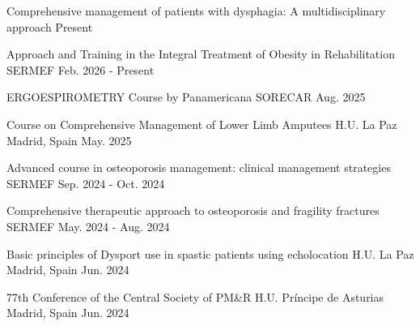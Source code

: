 

\begin{cventries}

  \cventry
    {Comprehensive management of patients with dysphagia: A multidisciplinary approach} %
    {} %
    {} %
    {Present} %
    {}

  \cventry
    {Approach and Training in the Integral Treatment of Obesity in Rehabilitation} %
    {SERMEF} %
    {} %
    {Feb. 2026 - Present} %
    {}

  \cventry
    {ERGOESPIROMETRY Course by Panamericana} %
    {SORECAR} %
    {} %
    {Aug. 2025} %
    {}

  \cventry
    {Course on Comprehensive Management of Lower Limb Amputees} %
    {H.U. La Paz} %
    {Madrid, Spain} %
    {May. 2025} %
    {}

  \cventry
    {Advanced course in osteoporosis management: clinical management strategies} %
    {SERMEF} %
    {} %
    {Sep. 2024 - Oct. 2024} %
    {}

  \cventry
    {Comprehensive therapeutic approach to osteoporosis and fragility fractures} %
    {SERMEF} %
    {} %
    {May. 2024 - Aug. 2024} %
    {}

  \cventry
    {Basic principles of Dysport use in spastic patients using echolocation} %
    {H.U. La Paz} %
    {Madrid, Spain} %
    {Jun. 2024} %
    {}

  \cventry
    {77th Conference of the Central Society of PM\&R} %
    {H.U. Príncipe de Asturias} %
    {Madrid, Spain} %
    {Jun. 2024} %
    {}


\end{cventries}
